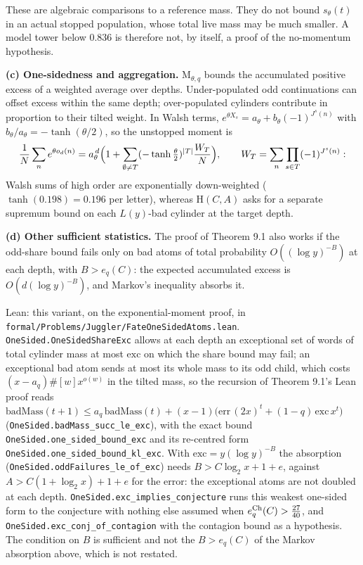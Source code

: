 \documentclass[11pt,a4paper]{article}
\begin{document}
These are algebraic comparisons to a reference mass. They do not bound
\(s_\theta(t)\) in an actual stopped population, whose total live mass
may be much smaller. A model tower below \(0.836\) is therefore not, by
itself, a proof of the no-momentum hypothesis.

\textbf{(c) One-sidedness and aggregation.} \(\mathrm M_{\theta,q}\)
bounds the accumulated positive excess of a weighted average over
depths. Under-populated odd continuations can offset excess within the
same depth; over-populated cylinders contribute in proportion to their
tilted weight. In Walsh terms,
\(e^{\theta X_s}=a_\theta+b_\theta(-1)^{J^s(n)}\) with
\(b_\theta/a_\theta=-\tanh(\theta/2)\), so the unstopped moment is \[
\frac1N\sum_ne^{\theta o_d(n)}=a_\theta^{\,d}\Bigl(1+\sum_{\emptyset\ne T}(-\tanh\tfrac\theta2)^{|T|}\frac{W_T}{N}\Bigr),
\qquad W_T=\sum_n\prod_{s\in T}(-1)^{J^s(n)} :
\] Walsh sums of high order are exponentially down-weighted
(\(\tanh(0.198)=0.196\) per letter), whereas \(\mathrm H(C,A)\) asks for
a separate supremum bound on each \(L(y)\)-bad cylinder at the target
depth.

\textbf{(d) Other sufficient statistics.} The proof of Theorem 9.1 also
works if the odd-share bound fails only on bad atoms of total
probability \(O((\log y)^{-B})\) at each depth, with \(B>e_q(C)\): the
expected accumulated excess is \(O(d(\log y)^{-B})\), and Markov's
inequality absorbs it.

Lean: this variant, on the exponential-moment proof, in
\texttt{\nolinkurl{formal/Problems/Juggler/FateOneSidedAtoms.lean}}.
\texttt{\nolinkurl{OneSided.OneSidedShareExc}} allows at each depth an
exceptional set of words of total cylinder mass at most \(\mathrm{exc}\)
on which the share bound may fail; an exceptional bad atom sends at most
its whole mass to its odd child, which costs \((x-a_q)\#[w]x^{o(w)}\) in
the tilted mass, so the recursion of Theorem 9.1's Lean proof reads
\(\mathrm{badMass}(t+1)\le a_q\,\mathrm{badMass}(t)+(x-1)\bigl(\mathrm{err}\,(2x)^t+(1-q)\,\mathrm{exc}\,x^t\bigr)\)
(\texttt{\nolinkurl{OneSided.badMass_succ_le_exc}}), with the exact
bound \texttt{\nolinkurl{OneSided.one_sided_bound_exc}} and its
re-centred form \texttt{\nolinkurl{OneSided.one_sided_bound_kl_exc}}.
With \(\mathrm{exc}=y(\log y)^{-B}\) the absorption
(\texttt{\nolinkurl{OneSided.oddFailures_le_of_exc}}) needs
\(B>C\log_2x+1+e\), against \(A>C(1+\log_2x)+1+e\) for the error: the
exceptional atoms are not doubled at each depth.
\texttt{\nolinkurl{OneSided.exc_implies_conjecture}} runs this weakest
one-sided form to the conjecture with nothing else assumed when
\(e^{\rm Ch}_q(C)>\tfrac{27}{40}\), and
\texttt{\nolinkurl{OneSided.exc_conj_of_contagion}} with the contagion
bound as a hypothesis. The condition on \(B\) is sufficient and not the
\(B>e_q(C)\) of the Markov absorption above, which is not restated.
\end{document}
